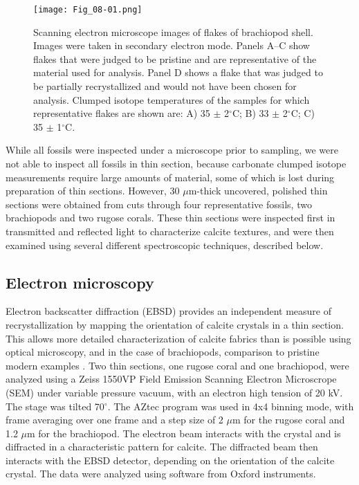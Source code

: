 \documentclass[5p, authoryear]{elsarticle}
\begin{document}
\begin{figure}[tb]
\centering
\texttt{[image: Fig\_08-01.png]}
\caption{Scanning electron microscope images of flakes of brachiopod shell. Images were taken in secondary electron mode. Panels A--C show flakes that were judged to be pristine and are representative of the material used for analysis. Panel D shows a flake that was judged to be partially recrystallized and would not have been chosen for analysis. Clumped isotope temperatures of the samples for which representative flakes are shown are: A) 35 $\pm$ 2$^{\circ}$C; B) 33 $\pm$ 2$^{\circ}$C; C) 35 $\pm$ 1$^{\circ}$C.}
\label{flakes}
\end{figure}

While all fossils were inspected under a microscope prior to sampling, we were not able to inspect all fossils in thin section, because carbonate clumped isotope measurements require large amounts of material, some of which is lost during preparation of thin sections. However, 30 $\mu$m-thick uncovered, polished thin sections were obtained from cuts through four representative fossils, two brachiopods and two rugose corals. These thin sections were inspected first in transmitted and reflected light to characterize calcite textures, and were then examined using several different spectroscopic techniques, described below. 

\subsection{Electron microscopy}

Electron backscatter diffraction (EBSD) provides an independent measure of recrystallization by mapping the orientation of calcite crystals in a thin section. This allows more detailed characterization of calcite fabrics than is possible using optical microscopy, and in the case of brachiopods, comparison to pristine modern examples \citep{PerezHuerta2007}. Two thin sections, one rugose coral and one brachiopod, were analyzed using a Zeiss 1550VP Field Emission Scanning Electron Microscrope (SEM) under variable pressure vacuum, with an electron high tension of 20 kV. The stage was tilted 70$^{\circ}$. The AZtec program was used in 4x4 binning mode, with frame averaging over one frame and a step size of 2 $\mu$m for the rugose coral and 1.2 $\mu$m for the brachiopod. The electron beam interacts with the crystal and is diffracted in a characteristic pattern for calcite. The diffracted beam then interacts with the EBSD detector, depending on the orientation of the calcite crystal. The data were analyzed using software from Oxford instruments.
\end{document}
